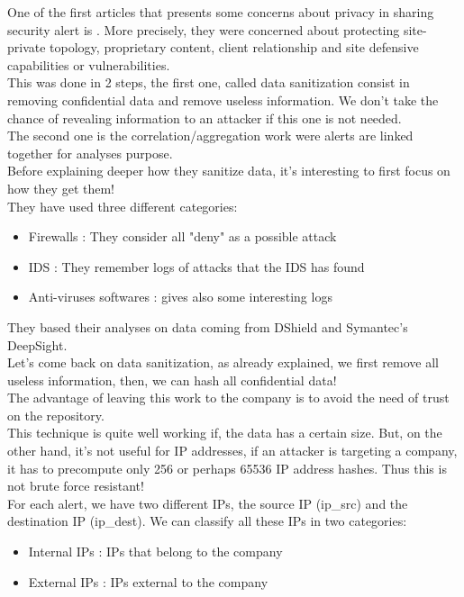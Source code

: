 \documentclass{eplmastersthesis}
\begin{document}
One of the first articles that presents some concerns about privacy in sharing security alert is \cite{lincoln2004privacy}.
More precisely, they were concerned about protecting site-private topology, proprietary content, client relationship and site defensive capabilities or vulnerabilities.\\
This was done in 2 steps, the first one, called data sanitization consist in removing confidential data and remove useless information. We don't take the chance of revealing information to an attacker if this one is not needed.\\
The second one is the correlation/aggregation work were alerts are linked together for analyses purpose.\\
Before explaining deeper how they sanitize data, it's interesting to first focus on how they get them!\\
 They have used three different categories:
\begin{itemize}
\item Firewalls : They consider all "deny" as a possible attack
\item IDS : They remember logs of attacks that the IDS has found
\item Anti-viruses softwares : gives also some interesting logs
\end{itemize}
They based their analyses on data coming from DShield and Symantec's DeepSight.\\

Let's come back on data sanitization, as already explained, we first remove all useless information, then, we can hash all confidential data!\\
The advantage of leaving this work to the company is to avoid the need of trust on the repository.\\
This technique is quite well working if, the data has a certain size. But, on the other hand, it's not useful for IP addresses, if an attacker is targeting a company, it has to precompute only 256 or perhaps 65536 IP address hashes. Thus this is not brute force resistant!\\
For each alert, we have two different IPs, the source IP (ip\_src) and the destination IP (ip\_dest). We can classify all these IPs in two categories:
\begin{itemize}
	\item Internal IPs : IPs that belong to the company
	\item External IPs : IPs external to the company
\end{itemize}
\end{document}
